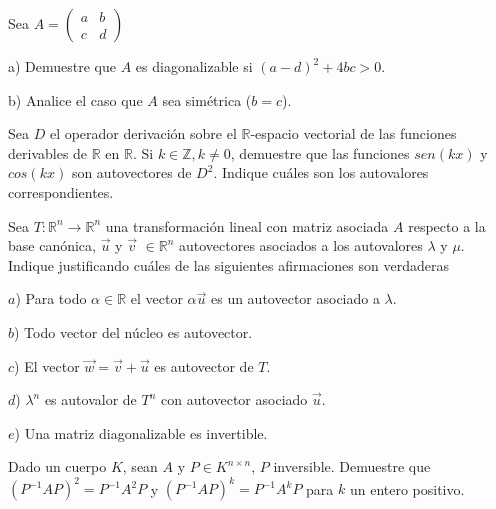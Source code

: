\begin{exercise} 
\item
Sea 
$A=\left(\begin{array}{cc}a & b \\c & d
\end{array}
 \right)$

 \bigskip
 
 
\noindent a)  Demuestre que $A$ es diagonalizable si $(a-d)^2+4bc > 0$.

\bigskip

\noindent b)  Analice el caso que $A$ sea simétrica ($b=c$).

\end{exercise} 


\bigskip


\begin{exercise} 
\item
 Sea $D$ el operador derivación sobre el $\mathbb{R}$-espacio vectorial de las funciones derivables de $\mathbb{R}$ en $\mathbb{R}$. Si $k \in \mathbb{Z}, k \neq 0$, demuestre que las funciones $sen(kx)$ y $cos(kx)$ son autovectores de $D^2$. Indique cuáles son los autovalores correspondientes. 
 \end{exercise}  
 \begin{exercise} 
\item

Sea $T:\mathbb{R}^n \rightarrow \mathbb{R}^n$ una transformación lineal con matriz asociada $A$ respecto a la base canónica, $\vec{u}$ y $\vec{v}$  
$ \in \mathbb{R}^n$ autovectores asociados a los autovalores $\lambda$ y $\mu$.
Indique justificando cuáles de las siguientes afirmaciones son verdaderas

$a$) Para todo $\alpha \in \mathbb{R}$ el vector $\alpha \vec{u}$ es un autovector asociado
a $\lambda$.

$b$) Todo vector del núcleo es autovector.

$c$) El vector $\vec{w}=\vec{v}+\vec{u}$ es autovector de $T$.

$d$) $\lambda^n$ es autovalor de $T^n$ con autovector asociado $\vec{u}$.

$e$) Una matriz diagonalizable es invertible.

\end{exercise} 
\begin{exercise} 
\item
 
 Dado un cuerpo $K$, sean $A$ y $P \in K^{n \times n}$, $P$ inversible. Demuestre que $(P^{-1}AP)^2=P^{-1}A^2P$ y  $(P^{-1}AP)^k=P^{-1}A^kP$ para $k$ un entero positivo.
 
 \end{exercise} 
